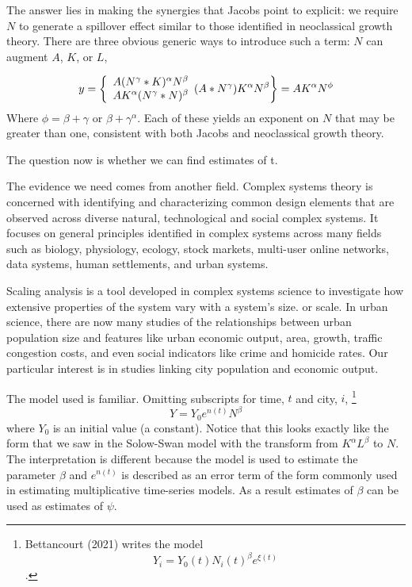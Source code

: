The answer lies in making the synergies that Jacobs point to explicit: we require $N$ to generate a spillover effect similar to those  identified in neoclassical growth theory. There are three obvious generic ways to introduce such a term: $N$ can augment $A$, $K$, or $L$, 

\begin{equation}
  y=\left\{
  \begin{array}{l}
    A (N^\gamma* K)^\alpha  N^\beta\\
    A K^\alpha (N^\gamma* N)^\beta
  \end{array}
     (A*N^\gamma) K^\alpha N^\beta\\
  \right\} =  AK^\alpha N^\phi
\end{equation}    
Where $\phi=\beta +\gamma$ or $\beta +\gamma^\alpha$. Each of these yields an exponent on $N$ that may be greater than one, consistent with both Jacobs and neoclassical growth theory. 

The question now is whether we can find estimates of t.

The evidence we need comes from another field. Complex systems theory is concerned with identifying and characterizing common design elements that are observed across diverse natural, technological and social complex systems. It focuses on general principles  identified in complex systems across many fields such as biology, physiology, ecology, stock markets, multi-user online  networks, data systems, human settlements, and urban systems.

Scaling analysis is a tool developed in complex systems science to investigate how extensive properties of the system vary with a system's size.  or scale.  In urban science, there are now many studies of  the relationships between urban population size and  features like urban economic output,  area, growth, traffic congestion costs, and even social  indicators like crime and homicide rates. Our particular interest is in studies linking city population  and  economic output. 

The model used is familiar. Omitting subscripts for time, $t$ and city, $i$, \footnote{Bettancourt (2021) writes the model \[Y_i = Y_0(t)N_i(t)^\beta e^{\xi(t)}\]. }
\[Y = Y_0e^{n(t)}N^\beta\]
where $Y_0$ is an initial value (a constant). Notice that this looks exactly like the form that we saw in the 
Solow-Swan model with the transform from $K^\alpha L^\beta$ to $N$.  The interpretation is different because the model is used to estimate the parameter $\beta$ and $e^{n(t)}$ is described  as an error term of the form commonly used in estimating multiplicative time-series models. As a result estimates of $\beta$  can be used as estimates  of $\psi$.

